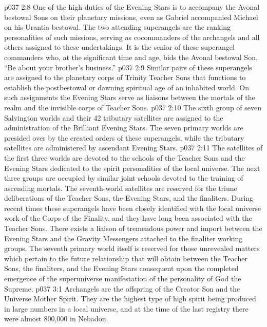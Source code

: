 \vs p037 2:8 One of the high duties of the Evening Stars is to accompany the Avonal bestowal Sons on their planetary missions, even as Gabriel accompanied Michael on his Urantia bestowal. The two attending superangels are the ranking personalities of such missions, serving as cocommanders of the archangels and all others assigned to these undertakings. It is the senior of these superangel commanders who, at the significant time and age, bids the Avonal bestowal Son, “Be about your brother’s business.”
\vs p037 2:9 Similar pairs of these superangels are assigned to the planetary corps of Trinity Teacher Sons that functions to establish the postbestowal or dawning spiritual age of an inhabited world. On such assignments the Evening Stars serve as liaisons between the mortals of the realm and the invisible corps of Teacher Sons.
\vs p037 2:10 \pc {} The sixth group of seven Salvington worlds and their 42 tributary satellites are assigned to the administration of the Brilliant Evening Stars. The seven primary worlds are presided over by the created orders of these superangels, while the tributary satellites are administered by ascendant Evening Stars.
\vs p037 2:11 The satellites of the first three worlds are devoted to the schools of the Teacher Sons and the Evening Stars dedicated to the spirit personalities of the local universe. The next three groups are occupied by similar joint schools devoted to the training of ascending mortals. The seventh\hyp{}world satellites are reserved for the triune deliberations of the Teacher Sons, the Evening Stars, and the finaliters. During recent times these superangels have been closely identified with the local universe work of the Corps of the Finality, and they have long been associated with the Teacher Sons. There exists a liaison of tremendous power and import between the Evening Stars and the Gravity Messengers attached to the finaliter working groups. The seventh primary world itself is reserved for those unrevealed matters which pertain to the future relationship that will obtain between the Teacher Sons, the finaliters, and the Evening Stars consequent upon the completed emergence of the superuniverse manifestation of the personality of God the Supreme.
\vs p037 3:1 Archangels are the offspring of the Creator Son and the Universe Mother Spirit. They are the highest type of high spirit being produced in large numbers in a local universe, and at the time of the last registry there were almost 800,000 in Nebadon.

